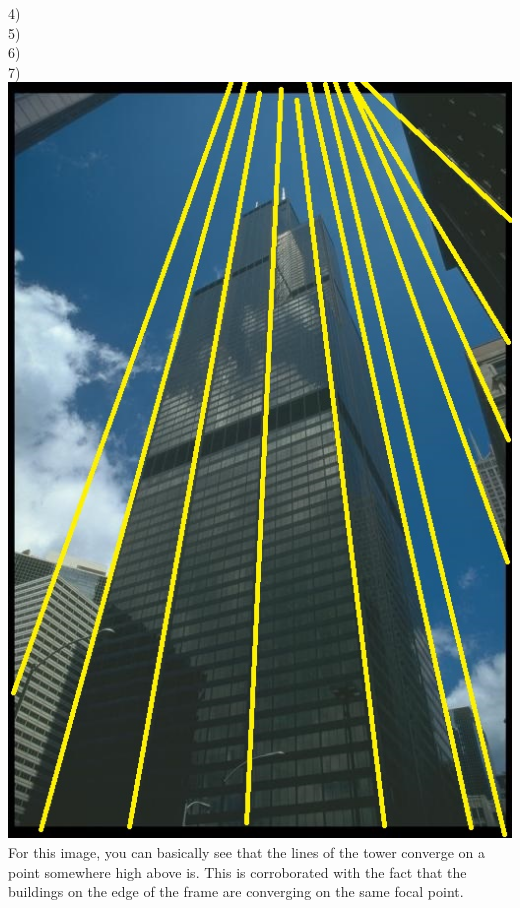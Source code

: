\documentclass[a4paper,12pt]{article}
\begin{document}
4)\\
5)\\
6)\\
7)\\
\includegraphics[scale=.5]{building.jpg}
For this image, you can basically see that the lines of the tower converge on a point somewhere high above is.  This is corroborated with the fact that the buildings on the edge of the frame are converging on the same focal point.  
\end{document}
